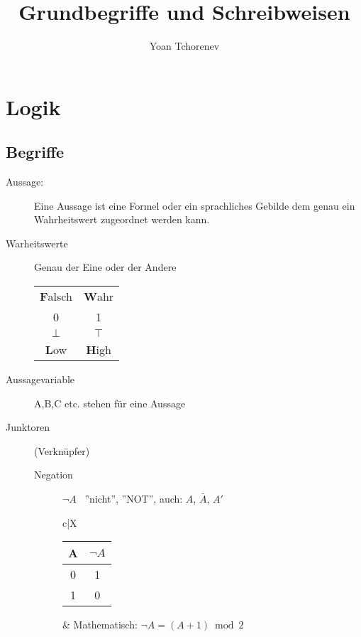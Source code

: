 \documentclass[12pt,a4paper]{article}
\title{Grundbegriffe und Schreibweisen}
\author{Yoan Tchorenev}
\begin{document}
\begin{titlepage}
	\maketitle
	\tableofcontents
\end{titlepage}

\section{Logik}
\subsection{Begriffe}
\begin{description}
	\item[Aussage:] Eine Aussage ist eine Formel oder ein sprachliches Gebilde dem genau ein Wahrheitswert zugeordnet werden kann.

	\item[Warheitswerte] Genau der Eine oder der Andere \\
		\begin{tabular}{c|c}
			\textbf{F}alsch & \textbf{W}ahr \\
			0               & 1             \\
			$\bot$          & $\top$        \\
			\textbf{L}ow    & \textbf{H}igh
		\end{tabular}

	\item[Aussagevariable] A,B,C etc. stehen für eine Aussage

	\item[Junktoren] (Verknüpfer)
		\begin{description}
			\item[Negation] $\neg A$ \, ''nicht'', ''NOT'', auch: $A$, $\bar{A}$, $A'$ \\
				\begin{tabularx}{\linewidth}{c|X}
					\begin{tabular}[t]{c|c}
						A & $\neg A$ \\ \hline
						0 & 1        \\
						1 & 0
					\end{tabular} &
					Mathematisch: $\neg A = (A + 1) \bmod 2$ \\ \hline
				\end{tabularx}


\end{description}
\end{description}
\end{document}
